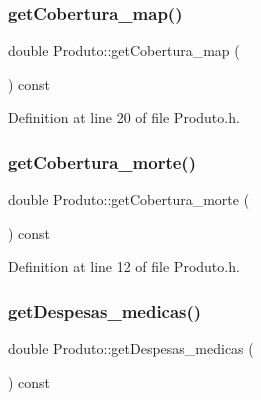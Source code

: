 \hypertarget{class_produto_a03ac2fedfec386c281e7eb5c9140949a}{}\label{class_produto_a03ac2fedfec386c281e7eb5c9140949a} 
\subsubsection{\texorpdfstring{get\+Cobertura\+\_\+map()}{getCobertura\_map()}}
{\footnotesize\ttfamily double Produto\+::get\+Cobertura\+\_\+map (\begin{DoxyParamCaption}{ }\end{DoxyParamCaption}) const\hspace{0.3cm}{\ttfamily [inline]}}



Definition at line 20 of file Produto.\+h.

\hypertarget{class_produto_a66eb39c5d64248b77430d6cf27cc902b}{}\label{class_produto_a66eb39c5d64248b77430d6cf27cc902b} 
\subsubsection{\texorpdfstring{get\+Cobertura\+\_\+morte()}{getCobertura\_morte()}}
{\footnotesize\ttfamily double Produto\+::get\+Cobertura\+\_\+morte (\begin{DoxyParamCaption}{ }\end{DoxyParamCaption}) const\hspace{0.3cm}{\ttfamily [inline]}}



Definition at line 12 of file Produto.\+h.

\hypertarget{class_produto_a0954f672347abb9b57b2083af89ccde3}{}\label{class_produto_a0954f672347abb9b57b2083af89ccde3} 
\subsubsection{\texorpdfstring{get\+Despesas\+\_\+medicas()}{getDespesas\_medicas()}}
{\footnotesize\ttfamily double Produto\+::get\+Despesas\+\_\+medicas (\begin{DoxyParamCaption}{ }\end{DoxyParamCaption}) const\hspace{0.3cm}{\ttfamily [inline]}}



